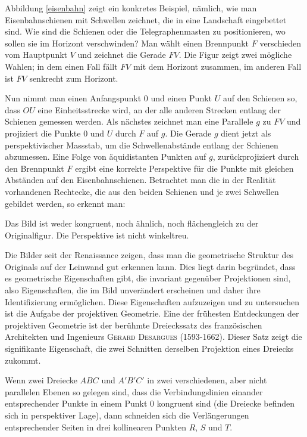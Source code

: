 \documentclass[%
11pt,%
twoside,%
titlepage,%
a4page,%
german,%
headsepline%
]{scrartcl}
\begin{document}
Abbildung \ref{eisenbahn} zeigt ein konkretes Beispiel, n\"amlich, wie man Eisenbahnschienen mit Schwellen zeichnet, die in eine Landschaft eingebettet sind. Wie sind die Schienen oder die Telegraphenmasten zu positionieren, wo sollen sie im Horizont verschwinden? Man w\"ahlt einen Brennpunkt $F$ verschieden vom Hauptpunkt $V$ und zeichnet die Gerade $FV$. Die Figur zeigt zwei m\"ogliche Wahlen; in dem einen Fall f\"allt $FV$ mit dem Horizont zusammen, im anderen Fall ist $FV$ senkrecht zum Horizont.

Nun nimmt man einen Anfangspunkt $0$ und einen Punkt $U$ auf den Schienen so, dass $OU$ eine Einheitsstrecke wird, an der alle anderen Strecken entlang der Schienen gemessen werden. Als n\"achstes zeichnet man eine Parallele $g$ zu $FV$ und projiziert die Punkte $0$ und $U$ durch $F$ auf $g$. Die Gerade $g$ dient jetzt als perspektivischer Massstab, um die Schwellenabst\"ande entlang der Schienen abzumessen. Eine Folge von \"aquidistanten Punkten auf $g$, zur\"uckprojiziert durch den Brennpunkt $F$ ergibt eine korrekte Perspektive f\"ur die Punkte mit gleichen Abst\"anden auf den Eisenbahnschienen.
Betrachtet man die in der Realit\"at vorhandenen Rechtecke, die aus den beiden Schienen und je zwei Schwellen gebildet werden, so erkennt man:

Das Bild ist weder kongruent, noch \"ahnlich, noch fl\"achengleich zu der Originalfigur.
Die Perspektive ist nicht winkeltreu.

Die Bilder seit der Renaissance zeigen, dass man die geometrische Struktur des Originals auf der Leinwand gut erkennen kann. Dies liegt darin begr\"undet, dass es geometrische Eigenschaften gibt, die invariant gegen\"uber Projektionen sind, also Eigenschaften, die im Bild unver\"andert erscheinen und daher ihre Identifizierung erm\"oglichen. Diese Eigenschaften aufzuzeigen und zu untersuchen ist die Aufgabe der projektiven Geometrie. Eine der fr\"uhesten Entdeckungen der projektiven Geometrie ist der ber\"uhmte Dreieckssatz des franz\"osischen Architekten und Ingenieurs \textsc{Gerard Desargues} (1593-1662). Dieser Satz zeigt die signifikante Eigenschaft, die zwei Schnitten derselben Projektion eines Dreiecks zukommt.

Wenn zwei Dreiecke $ABC$ und $A'B'C'$ in zwei verschiedenen, aber nicht parallelen Ebenen so gelegen sind, dass die Verbindungslinien einander entsprechender Punkte in einem Punkt $0$ kongruent sind (die Dreiecke befinden sich in perspektiver Lage), dann schneiden sich die Verl\"angerungen entsprechender Seiten in drei kollinearen Punkten $R$, $S$ und $T$.
\end{document}
